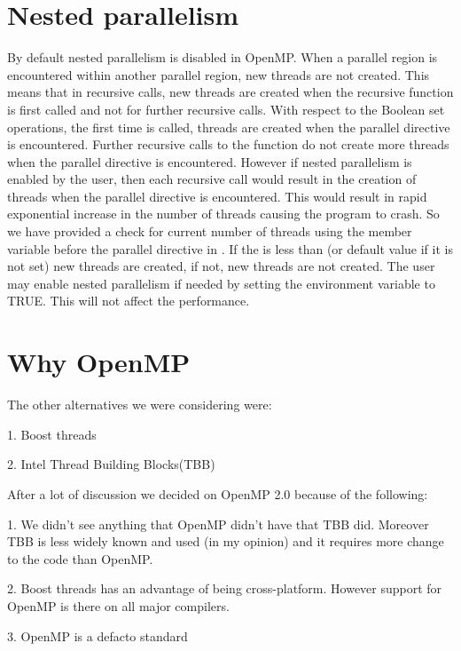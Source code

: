 \section{Nested parallelism\label{sec:nested_parallelism}}

By default nested parallelism is disabled in OpenMP. When a parallel region is encountered within another parallel region, new threads are not created. This means that in recursive calls, new threads are created when the recursive function is first called and not for further recursive calls. With respect to the Boolean set operations, the first time  is called, threads are created when the parallel directive is encountered. Further recursive calls to the function do not create more threads when the parallel directive is encountered. However if nested parallelism is enabled by the user, then each recursive call would result in the creation of threads when the parallel directive is encountered. This would result in rapid exponential increase in the number of threads causing the program to crash. So we have provided a check for current number of threads using the member variable  before the parallel directive in . If the  is less than  (or default value if it is not set) new threads are created, if not, new threads are not created.
The user may enable nested parallelism if needed by setting the environment variable  to TRUE. This will not affect the performance.

\section{Why OpenMP\label{sec:why_openmp}}

The other alternatives we were considering were: 

1. Boost threads

2. Intel Thread Building Blocks(TBB) 

After a lot of discussion we decided on OpenMP 2.0 because of the following:

1. We didn't see anything that OpenMP didn't have that TBB did. Moreover TBB is less widely known and used (in my opinion) and it requires more change to the code than OpenMP.

2. Boost threads has an advantage of being cross-platform. However support for OpenMP is there on all major compilers.

3. OpenMP is a defacto standard

